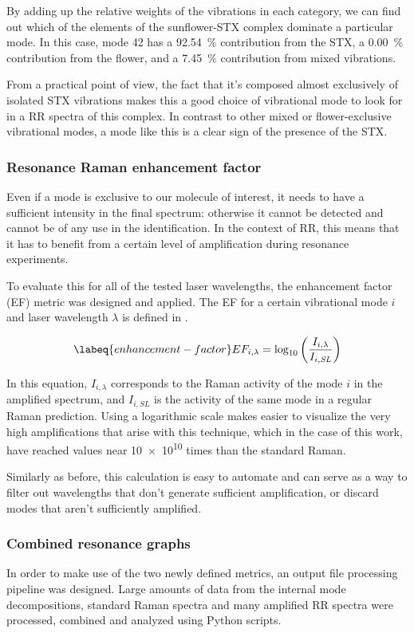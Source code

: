 By adding up the relative weights of the vibrations in each category, we can find out which of the elements of the sunflower-STX complex dominate a particular mode.
In this case, mode 42 has a \SI{92.54}{\percent} contribution from the STX, a \SI{0.00}{\percent} contribution from the flower, and a \SI{7.45}{\percent} contribution from mixed vibrations.

From a practical point of view, the fact that it's composed almost exclusively of isolated STX vibrations makes this a good choice of vibrational mode to look for in a RR spectra of this complex.
In contrast to other mixed or flower-exclusive vibrational modes, a mode like this is a clear sign of the presence of the STX.

\subsubsection{Resonance Raman enhancement factor}
Even if a mode is exclusive to our molecule of interest, it needs to have a sufficient intensity in the final spectrum: otherwise it cannot be detected and cannot be of any use in the identification.
In the context of RR, this means that it has to benefit from a certain level of amplification during resonance experiments.

To evaluate this for all of the tested laser wavelengths, the enhancement factor (EF) metric was designed and applied.
The EF for a certain vibrational mode $i$ and laser wavelength $\lambda$ is defined in .

\begin{equation}
    \labeq{enhancement-factor}
    EF_{i,\lambda} = \log_{10}\left(\frac{I_{i,\lambda}}{I_{i,\textit{SL}}}\right)
\end{equation}

In this equation, $I_{i,\lambda}$ corresponds to the Raman activity of the mode $i$ in the amplified spectrum, and $I_{i,\textit{SL}}$ is the activity of the same mode in a regular Raman prediction.
Using a logarithmic scale makes easier to visualize the very high amplifications that arise with this technique, which in the case of this work, have reached values near \num{10e10} times than the standard Raman.

Similarly as before, this calculation is easy to automate and can serve as a way to filter out wavelengths that don't generate sufficient amplification, or discard modes that aren't sufficiently amplified.

\subsubsection{Combined resonance graphs}
In order to make use of the two newly defined metrics, an output file processing pipeline was designed.
Large amounts of data from the internal mode decompositions, standard Raman spectra and many amplified RR spectra were processed, combined and analyzed using Python scripts.

